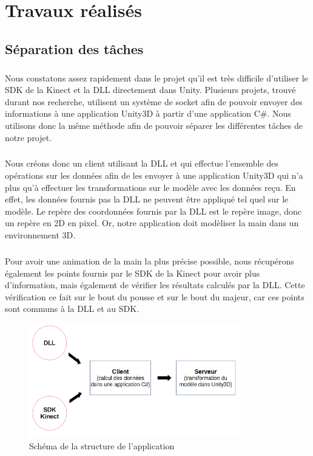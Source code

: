 \chapter{Travaux réalisés}


\section{Séparation des tâches}
\paragraph{}
Nous constatons assez rapidement dans le projet qu'il est très difficile d'utiliser
le SDK de la Kinect et la DLL directement dans Unity. Plusieurs projets, trouvé durant nos recherche, utilisent un système 
de socket afin de pouvoir envoyer des informations à une application Unity3D à partir d'une application C\#.
Nous utilisons donc la même méthode afin de pouvoir séparer les différentes tâches de notre projet.

\paragraph{}
Nous créons donc un client utilisant la DLL et qui effectue l'ensemble des opérations sur les données afin
de les envoyer à une application Unity3D qui n'a plus qu'à effectuer les transformations sur le modèle avec
les données reçu. En effet, les données fournis pas la DLL ne peuvent être appliqué tel quel sur le modèle.
Le repère des coordonnées fournis par la DLL est le repère image, donc un repère en 2D en pixel. Or, notre 
application doit modèliser la main dans un environnement 3D.

\paragraph{}
Pour avoir une animation de la main la plus précise possible, nous récupérons également les points fournis par
le SDK de la Kinect pour avoir plus d'information, mais également de vérifier les résultats calculés par 
la DLL. Cette vérification ce fait sur le bout du pousse et sur le bout du majeur, car ces points sont communs
à la DLL et au SDK.

\begin{figure}[H]
  \begin{center}
    \includegraphics[width=350px]{images/schemaAppli.png}
    \caption{Schéma de la structure de l'application}
  \end{center}
\end{figure}

